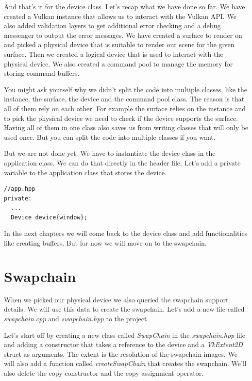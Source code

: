 \documentclass[12pt]{report} \usepackage{preamble}
\begin{document}
And that's it for the device class. Let's recap what we have done so far. We have created a Vulkan instance
that allows us to interact with the Vulkan \ac{API}. We also added validation layers to get additional error checking
and a debug messenger to output the error messages. We have created a surface to render on and picked a physical
device that is suitable to render our scene for the given surface. Then we created a logical device that is used
to interact with the physical device. We also created a command pool to manage the memory for storing command buffers.

You might ask yourself why we didn't split the code into multiple classes, like the instance, the surface, the device and
the command pool class. The reason is that all of them rely on each other. For example the surface relies on the instance
and to pick the physical device we need to check if the device supports the surface. Having all of them in one class
also saves us from writing classes that will only be used once. But you can split the code into multiple classes if you want.

But we are not done yet. We have to instantiate the device class in the application class. We can do that directly in the
header file. Let's add a private variable to the application class that stores the device.

\begin{lstlisting}[Language=C++]
//app.hpp
private:
  ...
  Device device{window};
\end{lstlisting}

In the next chapters we will come back to the device class and add functionalities like creating buffers. But for now
we will move on to the swapchain.

\section{Swapchain}

When we picked our physical device we also queried the swapchain support details. We will use this data to create
the swapchain. Let's add a new file called \textit{swapchain.cpp} and \textit{swapchain.hpp} to the project.

Let's start off by creating a new class called \textit{SwapChain} in the \textit{swapchain.hpp} file and adding a
constructor that takes a reference to the device and a \textit{VkExtent2D} struct as arguments. The extent is the
resolution of the swapchain images. We will also add a function called \textit{createSwapChain} that creates the swapchain.
We'll also delete the copy constructor and the copy assignment operator.
\end{document}
